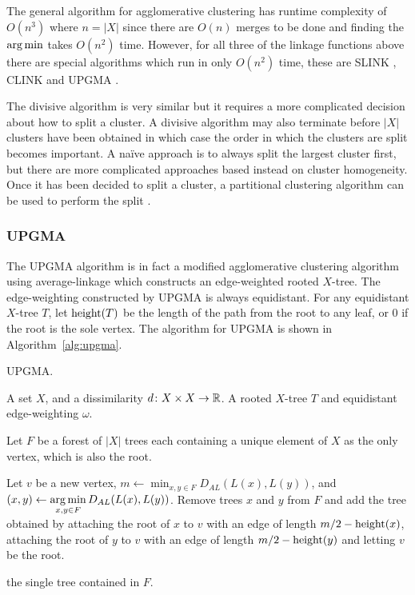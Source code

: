 The general algorithm for agglomerative clustering has runtime complexity of
$O(n^3)$ where $n = |X|$ since there are $O(n)$ merges to be done and finding
the $\operatorname*{arg\,min}$ takes $O(n^2)$ time.  However, for all three of the linkage
functions above there are special algorithms which run in only $O(n^2)$ time,
these are SLINK \citep{sibson1973slink}, CLINK \citep{defays1977efficient} and
UPGMA \citep{sokal1958statistical}.

The divisive algorithm is very similar but it requires a more complicated
decision about how to split a cluster.  A divisive algorithm may also
terminate before $|X|$ clusters have been obtained in which case the order in
which the clusters are split becomes important.  A naïve approach is to always
split the largest cluster first, but there are more complicated approaches
based instead on cluster homogeneity.  Once it has been decided to split a
cluster, a partitional clustering algorithm can be used to perform the split
\citep{ding2002cluster}.

\subsubsection{UPGMA}
\label{sec:upgma}

The UPGMA algorithm is in fact a modified agglomerative clustering algorithm
using average-linkage which constructs an edge-weighted rooted $X$-tree.  The
edge-weighting constructed by UPGMA is always equidistant.  For any
equidistant $X$-tree $T$, let $\operatorname{height}(T)$ be the length of the path from the
root to any leaf, or 0 if the root is the sole vertex.  The algorithm for
UPGMA is shown in Algorithm~\ref{alg:upgma}.

\begin{algorithm}[h]
  \caption{UPGMA.}
  \label{alg:upgma}

  \begin{algorithmic}
    \Require A set $X$, and a dissimilarity $d \colon X \times X \to {\mathbb R}$.
    \Ensure  A rooted $X$-tree $T$ and equidistant edge-weighting $\omega$.

    \State Let $F$ be a forest of $|X|$ trees each containing a unique element
    of $X$ as the only vertex, which is also the root.


       \State Let $v$ be a new vertex, $\displaystyle m \gets \min_{x,y
         \in F} D_{AL}(L(x),L(y))$, and $\displaystyle (x,y) \gets \operatorname*{arg\,min}_{x,y
         \in F} D_{AL}(L(x),L(y))$.
       \State Remove trees $x$ and $y$ from $F$ and add the tree obtained by
         attaching the root of $x$ to $v$ with an edge of length $m/2 -
         \operatorname{height}(x)$, attaching the root of $y$ to $v$ with an edge of length
         $m/2 - \operatorname{height}(y)$ and letting $v$ be the root.
    
    \EndWhile

    \State \Return the single tree contained in $F$.
  \end{algorithmic}
\end{algorithm}

